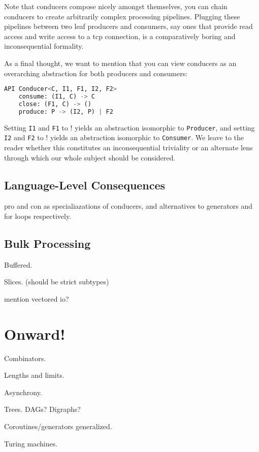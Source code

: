 \documentclass[sigplan,screen,10pt,anonymous,review]{acmart}
\begin{document}
Note that conducers compose nicely amongst themselves, you can chain conducers to create arbitrarily complex processing pipelines. Plugging these pipelines between two leaf producers and consumers, say ones that provide read access and write access to a tcp connection, is a comparatively boring and inconsequential formality.

As a final thought, we want to mention that you can view conducers as an overarching abstraction for both producers and consumers:

\begin{lstlisting}[language=Python]
API Conducer<C, I1, F1, I2, F2>
    consume: (I1, C) -> C
    close: (F1, C) -> ()
    produce: P -> (I2, P) | F2
\end{lstlisting}

Setting \texttt{I1} and \texttt{F1} to $!$ yields an abstraction isomorphic to \texttt{Producer}, and setting \texttt{I2} and \texttt{F2} to $!$ yields an abstraction isomorphic to \texttt{Consumer}. We leave to the reader whether this constitutes an inconsequential triviality or an alternate lens through which our whole subject should be considered.

\subsection{Language-Level Consequences}\label{syntax}

pro and con as specialiazations of conducers, and alternatives to generators and for loops respectively.

\subsection{Bulk Processing}\label{bulk}

Buffered.

Slices. (should be strict subtypes)

mention vectored io?

\section{Onward!}\label{fun}

Combinators.

Lengths and limits.

Asynchrony.

Trees. DAGs? Digraphs?

Coroutines/generators generalized.

Turing machines.
\end{document}
